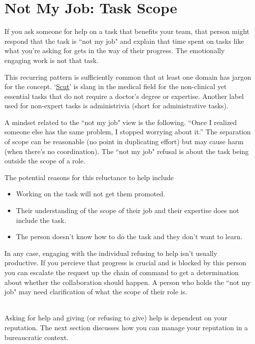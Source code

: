 \section{Not My Job: Task Scope}


If you ask someone for help on a task that benefits your team, that person might respond that the task is ``not my job" and explain that time spent on tasks like what you're asking for gets in the way of their progress. The emotionally engaging work is not that task.

This recurring pattern is sufficiently common that at least one domain has jargon for the concept.
`\href{https://www.urbandictionary.com/define.php?term=scut}{Scut}'\iftoggle{WPinmargin}{\marginpar{[Urbandictionary.com] scut}}{}
is  slang in the medical field for the non-clinical yet essential tasks that do not require a doctor's degree or expertise.
Another label used for non-expert tasks is administrivia (short for administrative tasks).

A mindset related to the ``not my job" view is the following.
``Once I realized someone else has the same problem, I stopped worrying about it.'' The separation of scope can be reasonable (no point in duplicating effort) but may cause harm (when there's no coordination). The ``not my job" refusal is  about the task being outside the scope of a role. 

The potential reasons for this reluctance to help include
\begin{itemize}
    \item Working on the task will not get them promoted.
    \item Their understanding of the scope of their job and their expertise does not include the task.
    \item The person doesn't know how to do the task and they don't want to learn.
\end{itemize}
In any case, engaging with the individual refusing to help isn't usually productive. 
If you percieve that progress is crucial and is blocked by this person you can escalate the request up the chain of command to get a determination about whether the collaboration should happen.
%
%
A person who holds the ``not my job" may need clarification of what the scope of their role is.

\ \\


Asking for help and giving (or refusing to give) help is dependent on your reputation.
The next section discusses how you can manage your reputation in a bureaucratic context.